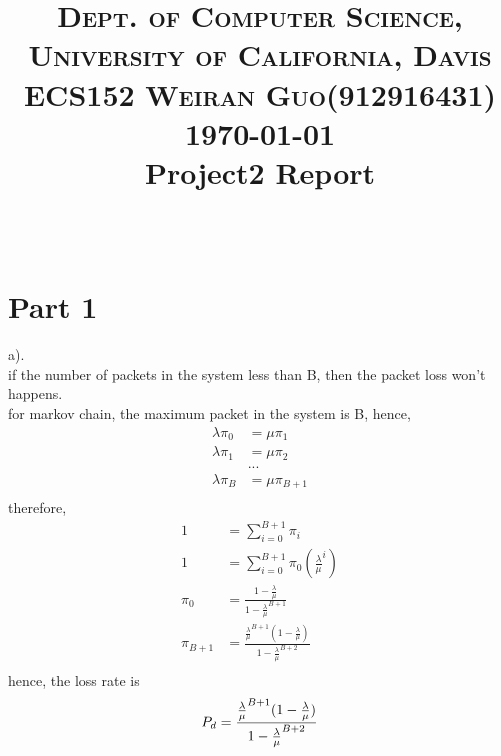 \documentclass[paper=a4, fontsize=11pt]{scrartcl}
\title{	
\normalfont \normalsize 
\textsc{Dept. of Computer Science, University of California, Davis\\ECS152 \hspace{.5in}
Weiran Guo(912916431) \hspace{.5in} \today}
\horrule{0.5pt} \\[0.4cm]
\huge Project2 Report \\
\horrule{2pt} \\[0.5cm]
}
\date{}
\DeclarePairedDelimiter\floor{\lfloor}{\rfloor}
\numberwithin{equation}{section} %
\numberwithin{figure}{section} %
\numberwithin{table}{section} %
\begin{document}
\maketitle

\vspace{-1in}


\section{Part 1}

       a).\\
       if the number of packets in the system less than B, %
       then the packet loss won't happens.\\
       
        for markov chain, the maximum packet in the system is B, hence,
        \begin{align}
            \lambda\pi_0 &= \mu\pi_1\\
            \lambda\pi_1 &= \mu\pi_2\\
                &...\\
            \lambda\pi_{B} &= \mu\pi_{B+1}\\
        \end{align}
        therefore,
        \begin{align}
            1 &= \sum_{i = 0}^{B+1} \pi_i\\
            1 &= \sum_{i = 0}^{B+1} \pi_0(\frac{\lambda}{\mu}^i)\\
            \pi_0 &= \frac{1-\frac{\lambda}{\mu}}{1-\frac{\lambda}{\mu}^{B+1}}\\
            \pi_{B+1} &= \frac{\frac{\lambda}{\mu}^{B+1}(1-\frac{\lambda}{\mu})}{1-\frac{\lambda}{\mu}^{B+2}}\\
        \end{align}
        hence, the loss rate is
        \begin{equation}
            P_d = \frac{\frac{\lambda}{\mu}^{B+1}(1-\frac{\lambda}{\mu})}{1-\frac{\lambda}{\mu}^{B+2}}\\
        \end{equation}
\end{document}

